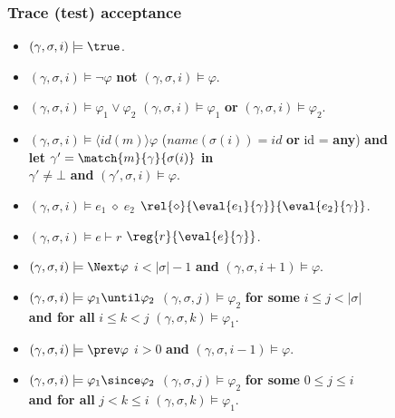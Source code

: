 \begin{frame}
  \frametitle{Trace (test) acceptance} \small

\begin{itemize}

\item $(\gamma,\sigma,i) \models \true$.

\item $(\gamma,\sigma,i) \models \neg \varphi$ \tabto{\tabconst} \iff{} 
{\bf not}  $(\gamma,\sigma,i) \models \varphi$.

\item $(\gamma,\sigma,i) \models \varphi_1 \lor \varphi_2$ \tabto{\tabconst} \iff{} $(\gamma,\sigma,i) \models \varphi_1$ {\bf or} $(\gamma,\sigma,i) \models \varphi_2$.

\pause
\item $(\gamma,\sigma,i) \models \langle id(m) \rangle \varphi$ \tabto{\tabconst} \iff{}
($name(\sigma(i)) = id$ {\bf or} id = {\bf any}) {\bf and}\\
\tabto{\tabconste} {\bf let} $\gamma' = \match{m}{\gamma}{\sigma(i)}$ {\bf in}\\
\tabto{\tabconste}  $\gamma' \neq \bot$ 
{\bf and} $(\gamma',\sigma,i) \models \varphi$.

\pause
\item $(\gamma,\sigma,i) \models e_1 \; \diamond \; e_2$ \tabto{\tabconst} \iff{} 
$\rel{\diamond}{\eval{e_1}{\gamma}}{\eval{e_2}{\gamma}}$.

\item $(\gamma,\sigma,i) \models e \vdash r$ \tabto{\tabconst} \iff{}
$\reg{r}{\eval{e}{\gamma}}$.


\pause
\item $(\gamma,\sigma,i) \models \Next \varphi$ \tabto{\tabconst} \iff{} 
$i < |\sigma|-1$ {\bf and} $(\gamma,\sigma,i+1) \models \varphi$.

\item $(\gamma,\sigma,i) \models \varphi_1 \until \varphi_2$ \tabto{\tabconst} \iff{} 
$(\gamma,\sigma,j) \models \varphi_2$ {\bf for some} $i \leq j < |\sigma|$\\
\tabto{\tabconste} {\bf and for all} $i \le k < j$ $(\gamma,\sigma,k) \models \varphi_1$.

\item $(\gamma,\sigma,i) \models \prev \varphi$ \tabto{\tabconst} \iff{} 
$i>0$ {\bf and} $(\gamma,\sigma,i-1) \models \varphi$.

\item $(\gamma,\sigma,i) \models \varphi_1 \since \varphi_2$
\tabto{\tabconst} \iff{} $(\gamma,\sigma,j) \models \varphi_2$ {\bf for some} $0 \leq j \leq i$\\
\tabto{\tabconste} {\bf and for all} $j < k \leq i$ $(\gamma,\sigma,k) \models \varphi_1$.

\end{itemize}

\end{frame}


